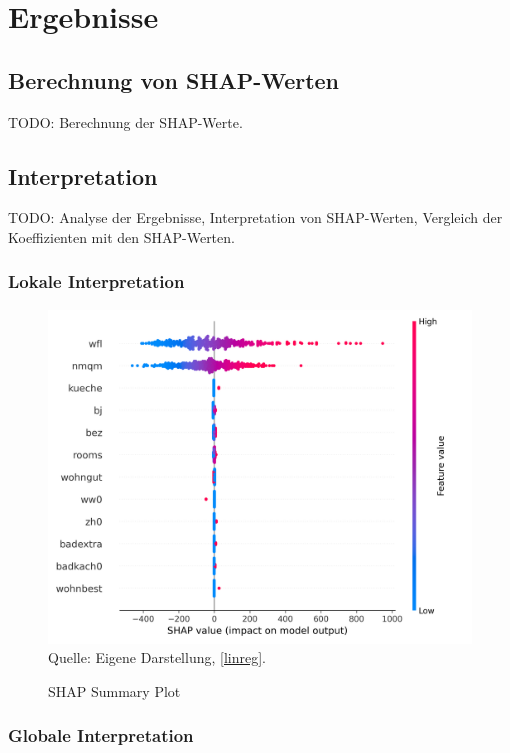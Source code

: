 \chapter{Ergebnisse}
\section{Berechnung von SHAP-Werten}

TODO: Berechnung der SHAP-Werte.

\section{Interpretation}

TODO: Analyse der Ergebnisse, Interpretation von SHAP-Werten, Vergleich der Koeffizienten mit den \acs{SHAP-Werten}.

\subsection{Lokale Interpretation}

\begin{figure}[h]
    \caption{SHAP Summary Plot}
    \includegraphics[width=1\textwidth]{../scripts/images/shap_summary_plot.png}
    Quelle: Eigene Darstellung, \ref{linreg}.
    \label{pic:shap_summary}
\end{figure}


\subsection{Globale Interpretation}


